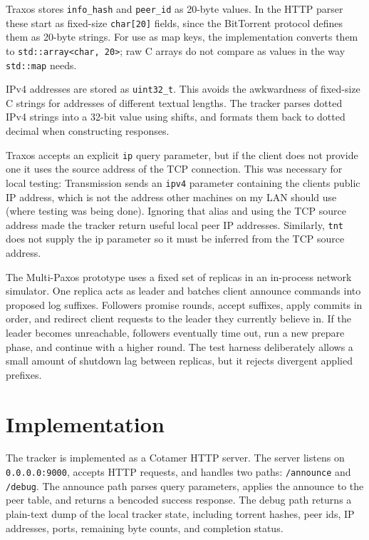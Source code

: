 \documentclass[letterpaper,twocolumn,10pt]{article}
\begin{document}
Traxos stores \texttt{info\_hash} and \texttt{peer\_id} as 20-byte values. In
the HTTP parser these start as fixed-size \texttt{char[20]} fields, since the
BitTorrent protocol defines them as 20-byte strings. For use as map keys, the
implementation converts them to \texttt{std::array<char, 20>}; raw C arrays do
not compare as values in the way \texttt{std::map} needs.

IPv4 addresses are stored as \texttt{uint32\_t}. This avoids the awkwardness
of fixed-size C strings for addresses of different textual lengths. The
tracker parses dotted IPv4 strings into a 32-bit value using shifts, and
formats them back to dotted decimal when constructing responses.

Traxos accepts an explicit \texttt{ip} query parameter, but if the client does
not provide one it uses the source address of the TCP connection. This was
necessary for local testing: Transmission sends an \texttt{ipv4} parameter
containing the clients public IP address, which is not the address other machines
on my LAN should use (where testing was being done). Ignoring that alias and
using the TCP source address made the tracker return useful local peer IP
addresses. Similarly, \texttt{tnt} does not supply the ip parameter so it must
be inferred from the TCP source address.

The Multi-Paxos prototype uses a fixed set of replicas in an in-process
network simulator. One replica acts as leader and batches client announce
commands into proposed log suffixes. Followers promise rounds, accept
suffixes, apply commits in order, and redirect client requests to the
leader they currently believe in. If the leader becomes unreachable,
followers eventually time out, run a new prepare phase, and continue with a
higher round. The test harness deliberately allows a small amount of
shutdown lag between replicas, but it rejects divergent applied prefixes.

\section{Implementation}

The tracker is implemented as a Cotamer HTTP server. The server listens on
\texttt{0.0.0.0:9000}, accepts HTTP requests, and handles two paths:
\texttt{/announce} and \texttt{/debug}. The announce path parses query
parameters, applies the announce to the peer table, and returns a bencoded
success response. The debug path returns a plain-text dump of the local
tracker state, including torrent hashes, peer ids, IP addresses, ports,
remaining byte counts, and completion status.
\end{document}
